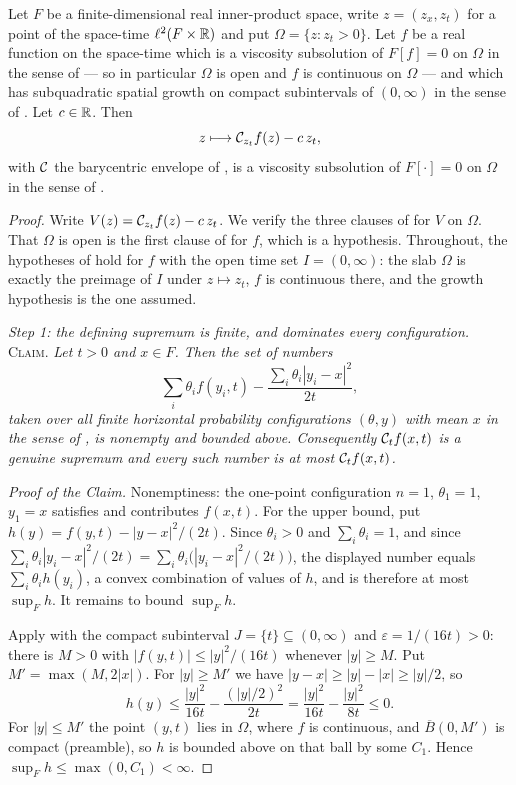\begin{corollary}
Let $F$ be a finite-dimensional real inner-product space, write $z=(z_x,z_t)$
for a point of the space-time $\ell^2(F\times\mathbb{R})$ and put
$\Omega=\{z:z_t>0\}$. Let $f$ be a real function on the space-time which is a
viscosity subsolution of $F[f]=0$ on $\Omega$ in the sense of
 --- so in particular $\Omega$ is open and $f$ is
continuous on $\Omega$ --- and which has subquadratic spatial growth on compact
subintervals of $(0,\infty)$ in the sense of . Let
$c\in\mathbb{R}$. Then
\[
  z\longmapsto\mathcal{C}_{z_t}f(z)-c\,z_t,
\]
with $\mathcal{C}$ the barycentric envelope of , is a viscosity
subsolution of $F[\cdot]=0$ on $\Omega$ in the sense of .
\end{corollary}
\begin{proof}
Write $V(z)=\mathcal{C}_{z_t}f(z)-c\,z_t$. We verify the three clauses of
 for $V$ on $\Omega$. That $\Omega$ is open is the first
clause of  for $f$, which is a hypothesis. Throughout, the
hypotheses of  hold for $f$ with the open time set
$I=(0,\infty)$: the slab $\Omega$ is exactly the preimage of $I$ under
$z\mapsto z_t$, $f$ is continuous there, and the growth hypothesis is the one
assumed.

\emph{Step 1: the defining supremum is finite, and dominates every
configuration.}
\textsc{Claim.} \emph{Let $t>0$ and $x\in F$. Then the set of numbers
\[
  \sum_i\theta_if(y_i,t)-\frac{\sum_i\theta_i|y_i-x|^2}{2t},
\]
taken over all finite horizontal probability configurations $(\theta,y)$ with
mean $x$ in the sense of , is nonempty and bounded above.
Consequently $\mathcal{C}_tf(x,t)$ is a genuine supremum and every such number is at
most $\mathcal{C}_tf(x,t)$.}

\emph{Proof of the Claim.} Nonemptiness: the one-point configuration $n=1$,
$\theta_1=1$, $y_1=x$ satisfies  and contributes
$f(x,t)$. For the upper bound, put
$h(y)=f(y,t)-|y-x|^2/(2t)$. Since $\theta_i>0$ and $\sum_i\theta_i=1$, and since
$\sum_i\theta_i|y_i-x|^2/(2t)=\sum_i\theta_i\bigl(|y_i-x|^2/(2t)\bigr)$, the
displayed number equals $\sum_i\theta_ih(y_i)$, a convex combination of values of
$h$, and is therefore at most $\sup_Fh$. It remains to bound $\sup_Fh$.

Apply  with the compact subinterval
$J=\{t\}\subseteq(0,\infty)$ and $\varepsilon=1/(16t)>0$: there is $M>0$ with
$|f(y,t)|\le|y|^2/(16t)$ whenever $|y|\ge M$. Put
$M'=\max(M,2|x|)$. For $|y|\ge M'$ we have $|y-x|\ge|y|-|x|\ge|y|/2$, so
\[
  h(y)\le\frac{|y|^2}{16t}-\frac{(|y|/2)^2}{2t}
       =\frac{|y|^2}{16t}-\frac{|y|^2}{8t}\le0 .
\]
For $|y|\le M'$ the point $(y,t)$ lies in $\Omega$, where $f$ is continuous, and
$\overline B(0,M')$ is compact (preamble), so $h$ is bounded above on that ball
by some $C_1$. Hence $\sup_Fh\le\max(0,C_1)<\infty$.


\end{proof}
